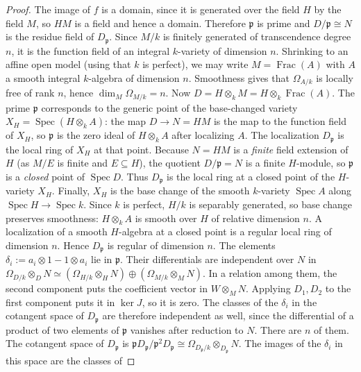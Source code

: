 \documentclass[11pt,a4paper]{amsart}
\numberwithin{equation}{section}
\newcommand{\Spec}{\operatorname{Spec}}
\newcommand{\Frac}{\operatorname{Frac}}
\begin{document}
\begin{proof}
The image of \(f\) is  a domain, since it is generated over the field
	\(H\) by the field \(M\), so \(HM\) is a field and hence a domain.
Therefore \(\mathfrak p\) is prime and
\(D/\mathfrak p\cong N\) is the residue field of \(D_{\mathfrak p}\).
Since \(M/k\) is finitely generated of transcendence degree \(n\), it is
the function field of an integral \(k\)-variety of dimension \(n\).
Shrinking to an affine open model (using that \(k\) is
perfect), we may write \(M=\Frac(A)\) with \(A\) a smooth integral
\(k\)-algebra of dimension \(n\). Smoothness gives that
\(\Omega_{A/k}\) is locally free of rank \(n\), hence
\(\dim_M\Omega_{M/k}=n\).
Now \(D=H\otimes_k M=H\otimes_k\Frac(A)\). The prime \(\mathfrak p\)
corresponds to the generic point of the base-changed variety
\(X_H=\Spec(H\otimes_k A)\): the map \(D\to N=HM\) is the map to the
function field of \(X_H\), so \(\mathfrak p\) is the zero ideal of
\(H\otimes_k A\) after localizing \(A\). The localization
\(D_{\mathfrak p}\) is the local ring of \(X_H\) at that point.
Because \(N=HM\) is a \emph{finite} field extension of \(H\) (as
\(M/E\) is finite and \(E\subseteq H\)), the quotient \(D/\mathfrak p=N\)
is a finite \(H\)-module, so \(\mathfrak p\) is a \emph{closed} point of
	\(\Spec D\). Thus \(D_{\mathfrak p}\) is the local ring at a closed
point of the \(H\)-variety \(X_H\).
Finally, \(X_H\) is the base change of the smooth
\(k\)-variety \(\Spec A\) along \(\Spec H\to\Spec k\). Since \(k\) is
perfect, \(H/k\) is separably generated, so base change preserves
 smoothness: \(H\otimes_k A\) is smooth over \(H\) of relative dimension
\(n\). A localization of a smooth \(H\)-algebra at a closed point is a
regular local ring of dimension \(n\). Hence \(D_{\mathfrak p}\) is
 		regular of dimension \(n\).
The elements $\delta_i:=a_i\otimes 1-1\otimes a_i$ lie in
 $\mathfrak p$. Their differentials are independent over $N$ in
 $	\Omega_{D/k}\otimes_D N
\simeq(\Omega_{H/k}\otimes_H N)\oplus(\Omega_{M/k}\otimes_M N).	$ 
In a relation among them, the second component puts the coefficient
vector in $W\otimes_M N$. Applying $D_1,D_2$ to the first
component puts it in $\ker J$, so it is zero. The classes of the
$\delta_i$ in the cotangent space of $D_{\mathfrak p}$ are
therefore independent as well, since the differential of a product
of two elements of $\mathfrak p$ vanishes after reduction to $N$.
There are $n$ of them.  		The cotangent space of \(D_{\mathfrak p}\) is
$\mathfrak pD_{\mathfrak p}/\mathfrak p^2D_{\mathfrak p}
 		\cong \Omega_{D_{\mathfrak p}/k}\otimes_{D_{\mathfrak p}}N .
$ The images of the \(\delta_i\) in this space are the classes of

\end{proof}
\end{document}

